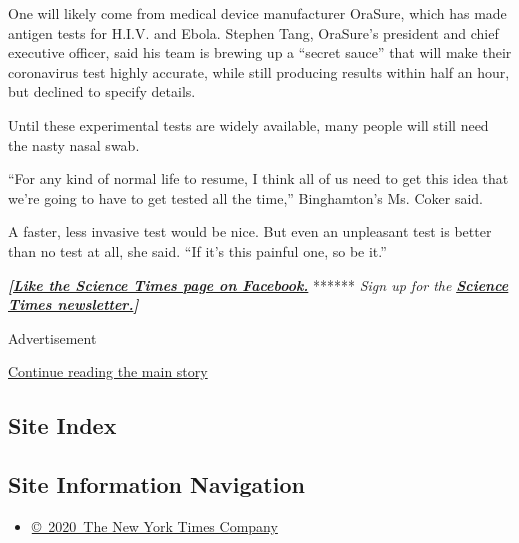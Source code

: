 One will likely come from medical device manufacturer OraSure, which has
made antigen tests for H.I.V. and Ebola. Stephen Tang, OraSure's
president and chief executive officer, said his team is brewing up a
``secret sauce'' that will make their coronavirus test highly accurate,
while still producing results within half an hour, but declined to
specify details.

Until these experimental tests are widely available, many people will
still need the nasty nasal swab.

``For any kind of normal life to resume, I think all of us need to get
this idea that we're going to have to get tested all the time,''
Binghamton's Ms. Coker said.

A faster, less invasive test would be nice. But even an unpleasant test
is better than no test at all, she said. ``If it's this painful one, so
be it.''

\textbf{\emph{{[}}\href{http://on.fb.me/1paTQ1h}{\emph{Like the Science
Times page on Facebook.}}} ****** \emph{\textbar{} Sign up for the}
\textbf{\href{http://nyti.ms/1MbHaRU}{\emph{Science Times
newsletter.}}\emph{{]}}}

Advertisement

\protect\hyperlink{after-bottom}{Continue reading the main story}

\hypertarget{site-index}{%
\subsection{Site Index}\label{site-index}}

\hypertarget{site-information-navigation}{%
\subsection{Site Information
Navigation}\label{site-information-navigation}}

\begin{itemize}
\tightlist
\item
  \href{https://help.nytimes.com/hc/en-us/articles/115014792127-Copyright-notice}{©~2020~The
  New York Times Company}
\end{itemize}


